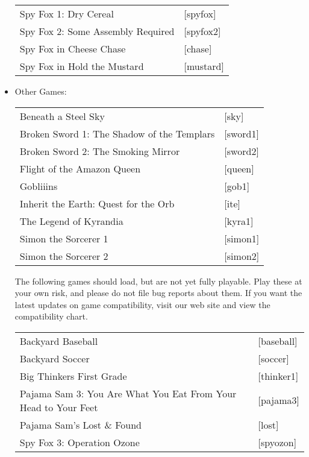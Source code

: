 \begin{itemize}
\begin{tabular}[h]{ll}
    Spy Fox 1: Dry Cereal&                                         [spyfox]\\
    Spy Fox 2: Some Assembly Required&                             [spyfox2]\\
    Spy Fox in Cheese Chase&                                       [chase]\\
    Spy Fox in Hold the Mustard&                                   [mustard]\\
  \end{tabular}
\item Other Games:\\ 
  \begin{tabular}[h]{ll}
    Beneath a Steel Sky&                           [sky]\\
    Broken Sword 1: The Shadow of the Templars&    [sword1]\\
    Broken Sword 2: The Smoking Mirror&            [sword2]\\
    Flight of the Amazon Queen&                    [queen]\\
    Gobliiins&                                     [gob1]\\
    Inherit the Earth: Quest for the Orb&          [ite]\\
    The Legend of Kyrandia&                        [kyra1]\\
    Simon the Sorcerer 1&                          [simon1]\\
    Simon the Sorcerer 2&                          [simon2]\\
  \end{tabular}

  The following games should load, but are not yet fully playable. Play these at your own risk, and please do not file bug reports about them. If you want
the latest updates on game compatibility, visit our web site and view the
compatibility chart.

\begin{tabular}{ll}
  Backyard Baseball&                                             [baseball]\\
  Backyard Soccer&                                               [soccer]\\
  Big Thinkers First Grade&                                      [thinker1]\\
  Pajama Sam 3: You Are What You Eat From Your Head to Your Feet&[pajama3]\\
  Pajama Sam's Lost \& Found&                                    [lost]\\
  Spy Fox 3: Operation Ozone&                                    [spyozon]\\
\end{tabular}


\end{itemize}
